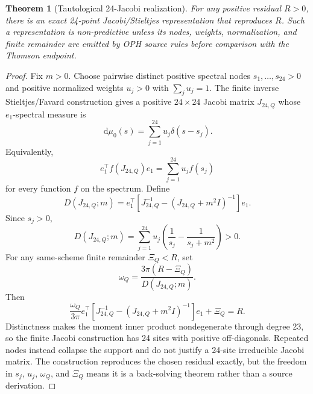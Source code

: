 \documentclass[11pt]{article}
\newtheorem{theorem}{Theorem}
\theoremstyle{remark}
\newcommand{\dd}{\,\mathrm d}
\begin{document}
\begin{theorem}[Tautological 24-Jacobi realization]
For any positive residual \(R>0\), there is an exact 24-point Jacobi/Stieltjes representation that
reproduces \(R\). Such a representation is non-predictive unless its nodes, weights,
normalization, and finite remainder are emitted by OPH source rules before comparison with the
Thomson endpoint.
\end{theorem}

\begin{proof}
Fix \(m>0\). Choose pairwise distinct positive spectral nodes
\(s_1,\ldots,s_{24}>0\) and positive normalized weights
\(u_j>0\) with \(\sum_j u_j=1\). The finite inverse Stieltjes/Favard construction gives a
positive \(24\times24\) Jacobi matrix \(J_{24,Q}\) whose \(e_1\)-spectral measure is
\[
\dd\mu_0(s)=\sum_{j=1}^{24}u_j\delta(s-s_j).
\]
Equivalently,
\[
e_1^\top f(J_{24,Q})e_1=\sum_{j=1}^{24}u_j f(s_j)
\]
for every function \(f\) on the spectrum. Define
\[
D(J_{24,Q};m)
=
e_1^\top\!\left[J_{24,Q}^{-1}-(J_{24,Q}+m^2I)^{-1}\right]e_1.
\]
Since \(s_j>0\),
\[
D(J_{24,Q};m)=
\sum_{j=1}^{24}u_j\left(\frac1{s_j}-\frac1{s_j+m^2}\right)>0.
\]
For any same-scheme finite remainder \(\Xi_Q<R\), set
\[
\omega_Q=\frac{3\pi(R-\Xi_Q)}{D(J_{24,Q};m)}.
\]
Then
\[
\frac{\omega_Q}{3\pi}
e_1^\top\!\left[J_{24,Q}^{-1}-(J_{24,Q}+m^2I)^{-1}\right]e_1
+\Xi_Q
=R.
\]
Distinctness makes the moment inner product nondegenerate through degree 23,
so the finite Jacobi construction has 24 sites with positive off-diagonals.
Repeated nodes instead collapse the support and do not justify a 24-site
irreducible Jacobi matrix. The construction reproduces the chosen residual exactly, but the freedom in \(s_j\), \(u_j\),
\(\omega_Q\), and \(\Xi_Q\) means it is a back-solving theorem rather than a source derivation.
\end{proof}
\end{document}

